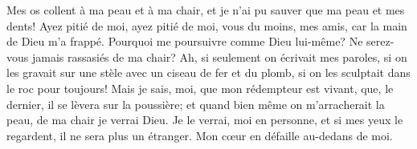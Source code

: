 Mes os collent à ma peau et à ma chair,
	et je n’ai pu sauver que ma peau et mes dents!
Ayez pitié de moi, ayez pitié de moi, vous du moins, mes amis,
	car la main de Dieu m’a frappé.
Pourquoi me poursuivre comme Dieu lui-même?
Ne serez-vous jamais rassasiés de ma chair?
Ah, si seulement on écrivait mes paroles,
	si on les gravait sur une stèle avec un ciseau de fer et du plomb,
	si on les sculptait dans le roc pour toujours!
Mais je sais, moi, que mon rédempteur est vivant,
	que, le dernier, il se lèvera sur la poussière;
	et quand bien même on m’arracherait la peau, de ma chair je verrai Dieu.
Je le verrai, moi en personne,
	et si mes yeux le regardent, il ne sera plus un étranger.
	Mon cœur en défaille au-dedans de moi.
